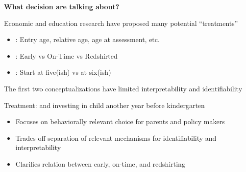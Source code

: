 \documentclass[t,aspectratio=169,11pt,presentation]{beamer}
\newenvironment{wideitemize}{\itemize\addtolength{\itemsep}{14pt}}{\enditemize}
\begin{document}

\appendix
{}



\begin{frame}[label=whywaiting]{\textbf{What decision are talking about?}}

\begin{wideitemize}
    \item Economic and education research have proposed many potential ``treatments''
    \begin{itemize}
        \item<2-> \textbf{}: Entry age, relative age, age at assessment, etc.
        \item<3-> \textbf{}: Early vs On-Time vs Redshirted
        \item<4-> \textbf{}: Start at five(ish) vs at six(ish)
        
    \end{itemize}
    
    
    \item<5-> The first two conceptualizations have limited interpretability and identifiability
        
        {\tiny \color{gray}\citep[see for example][]{angrist2008mostly,barua2016school}}
        
    
    \item<6-> Treatment: \textbf{\color{ptr3}{waiting}} and investing in child another year before kindergarten
    
     {\tiny \color{gray}\citep[following binary definition in][]{black2011too,dhuey2019school}}
    
    \begin{itemize}
        \item Focuses on behaviorally relevant choice for parents and policy makers 
        \item Trades off separation of relevant mechanisms for identifiability and interpretability
        \item Clarifies relation between early, on-time, and redshirting 
    \end{itemize}
        

   
    
    
\end{wideitemize}


\hyperlink{wait1}{}
\end{frame}
\end{document}
